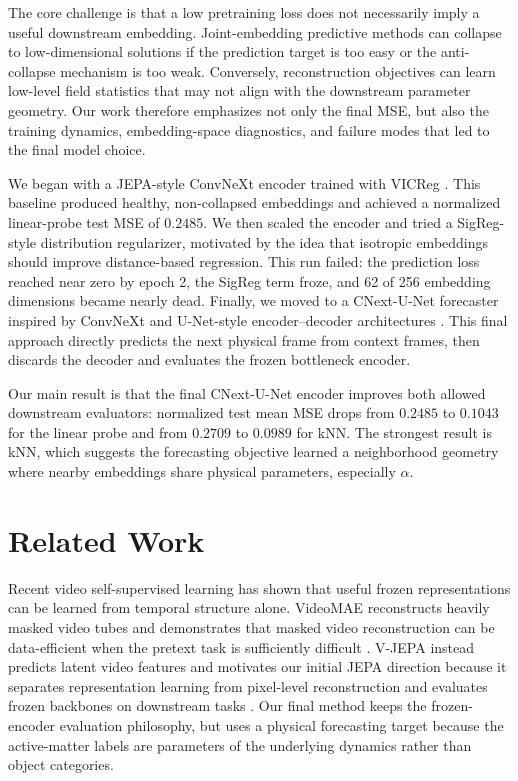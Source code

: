 \documentclass{article}
\begin{document}
The core challenge is that a low pretraining loss does not necessarily imply a useful downstream embedding. Joint-embedding predictive methods can collapse to low-dimensional solutions if the prediction target is too easy or the anti-collapse mechanism is too weak. Conversely, reconstruction objectives can learn low-level field statistics that may not align with the downstream parameter geometry. Our work therefore emphasizes not only the final MSE, but also the training dynamics, embedding-space diagnostics, and failure modes that led to the final model choice.

We began with a JEPA-style ConvNeXt encoder trained with VICReg \citep{bardes2021vicreg}. This baseline produced healthy, non-collapsed embeddings and achieved a normalized linear-probe test MSE of $0.2485$. We then scaled the encoder and tried a SigReg-style distribution regularizer, motivated by the idea that isotropic embeddings should improve distance-based regression. This run failed: the prediction loss reached near zero by epoch 2, the SigReg term froze, and 62 of 256 embedding dimensions became nearly dead. Finally, we moved to a CNext-U-Net forecaster inspired by ConvNeXt \citep{liu2022convnext} and U-Net-style encoder--decoder architectures \citep{ronneberger2015unet}. This final approach directly predicts the next physical frame from context frames, then discards the decoder and evaluates the frozen bottleneck encoder.

Our main result is that the final CNext-U-Net encoder improves both allowed downstream evaluators: normalized test mean MSE drops from $0.2485$ to $0.1043$ for the linear probe and from $0.2709$ to $0.0989$ for kNN. The strongest result is kNN, which suggests the forecasting objective learned a neighborhood geometry where nearby embeddings share physical parameters, especially $\alpha$.

\section{Related Work}

Recent video self-supervised learning has shown that useful frozen representations can be learned from temporal structure alone. VideoMAE reconstructs heavily masked video tubes and demonstrates that masked video reconstruction can be data-efficient when the pretext task is sufficiently difficult \citep{tong2022videomae}. V-JEPA instead predicts latent video features and motivates our initial JEPA direction because it separates representation learning from pixel-level reconstruction and evaluates frozen backbones on downstream tasks \citep{bardes2024vjepa}. Our final method keeps the frozen-encoder evaluation philosophy, but uses a physical forecasting target because the active-matter labels are parameters of the underlying dynamics rather than object categories.
\end{document}
